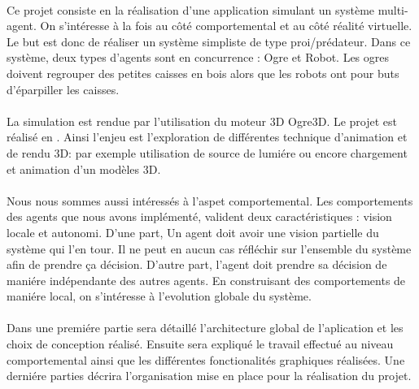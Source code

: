 \paragraph{}Ce projet consiste en la réalisation d'une application simulant un système
multi-agent. On s'intéresse à la fois au côté comportemental et au côté réalité virtuelle.
Le but est donc de réaliser un système simpliste de type proi/prédateur.
Dans ce système, deux types d'agents sont en concurrence : Ogre et Robot. Les
ogres doivent regrouper des petites caisses en bois alors que les robots ont
pour buts d'éparpiller les caisses.

\paragraph{}La simulation est rendue par l'utilisation du moteur 3D Ogre3D. Le projet est
réalisé en \CS. Ainsi l'enjeu est l'exploration de différentes technique d'animation 
et de rendu 3D: par exemple utilisation de source de lumiére ou encore chargement et 
animation d'un modèles 3D. 

\paragraph{}Nous nous sommes aussi intéressés à l'aspet comportemental. Les comportements des
agents que nous avons implémenté, valident deux caractéristiques : vision locale et 
autonomi. D'une part, Un agent doit avoir une vision partielle du système qui l'en tour. 
Il ne peut en aucun cas réfléchir sur l'ensemble du système afin de prendre ça décision. 
D'autre part, l'agent doit prendre sa décision de maniére indépendante des autres agents.
En construisant des comportements de maniére local, on s'intéresse à l'evolution globale
du système.


\paragraph{} Dans une premiére partie sera détaillé l'architecture global de l'aplication
et les choix de conception réalisé. Ensuite sera expliqué le travail effectué au niveau 
comportemental ainsi que les différentes fonctionalités graphiques réalisées. Une derniére 
parties décrira l'organisation mise en place pour la réalisation du projet.

